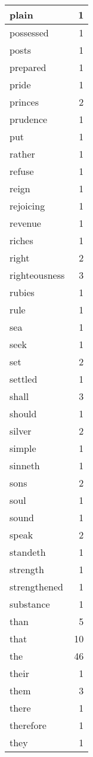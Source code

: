 \begin{center}
\begin{longtable}{l|r}
plain & 1\\ \hline 
possessed & 1\\ \hline 
posts & 1\\ \hline 
prepared & 1\\ \hline 
pride & 1\\ \hline 
princes & 2\\ \hline 
prudence & 1\\ \hline 
put & 1\\ \hline 
rather & 1\\ \hline 
refuse & 1\\ \hline 
reign & 1\\ \hline 
rejoicing & 1\\ \hline 
revenue & 1\\ \hline 
riches & 1\\ \hline 
right & 2\\ \hline 
righteousness & 3\\ \hline 
rubies & 1\\ \hline 
rule & 1\\ \hline 
sea & 1\\ \hline 
seek & 1\\ \hline 
set & 2\\ \hline 
settled & 1\\ \hline 
shall & 3\\ \hline 
should & 1\\ \hline 
silver & 2\\ \hline 
simple & 1\\ \hline 
sinneth & 1\\ \hline 
sons & 2\\ \hline 
soul & 1\\ \hline 
sound & 1\\ \hline 
speak & 2\\ \hline 
standeth & 1\\ \hline 
strength & 1\\ \hline 
strengthened & 1\\ \hline 
substance & 1\\ \hline 
than & 5\\ \hline 
that & 10\\ \hline 
the & 46\\ \hline 
their & 1\\ \hline 
them & 3\\ \hline 
there & 1\\ \hline 
therefore & 1\\ \hline 
they & 1\\ \hline 

\end{longtable}
\end{center}
